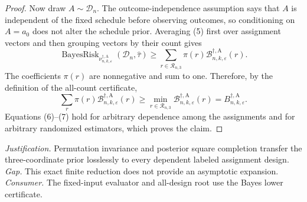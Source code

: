 \documentclass{article}
\begin{document}
{\begin{proof}
Now draw \(A\sim\mathcal D_n\).  The outcome-independence assumption says that
\(A\) is independent of the fixed schedule before observing outcomes, so
conditioning on \(A=a_0\) does not alter the schedule prior.  Averaging (5) first
over assignment vectors and then grouping vectors by their count gives
\[
 \operatorname{BayesRisk}_{\nu_{n,k,\varepsilon}^{\dagger,\mathrm A}}
       (\mathcal D_n,\widehat\tau)
 \ge\sum_{r\in\mathcal R_{n,3}}\pi(r)
       \mathcal B_{n,k,\varepsilon}^{\dagger,\mathrm A}(r).
\tag{6}
\]
The coefficients \(\pi(r)\) are nonnegative and sum to one.  Therefore, by the
definition of the all-count certificate,
\[
 \sum_r\pi(r)\mathcal B_{n,k,\varepsilon}^{\dagger,\mathrm A}(r)
 \ge\min_{r\in\mathcal R_{n,3}}
       \mathcal B_{n,k,\varepsilon}^{\dagger,\mathrm A}(r)
 =B_{n,k,\varepsilon}^{\dagger,\mathrm A}.
\tag{7}
\]
Equations (6)--(7) hold for arbitrary dependence among the assignments and for
arbitrary randomized estimators, which proves the claim.
\end{proof}
\par\smallskip\noindent \textit{Justification.} Permutation invariance and posterior square completion transfer the three-coordinate prior losslessly to every dependent labeled assignment design. \textit{Gap.} This exact finite reduction does not provide an asymptotic expansion. \textit{Consumer.} The fixed-input evaluator and all-design root use the Bayes lower certificate.

}
\end{document}
